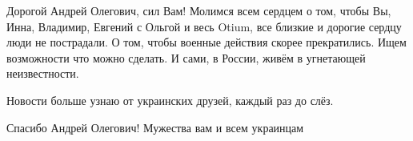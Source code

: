 \begin{itemize}

Дорогой Андрей Олегович, сил Вам! Молимся всем сердцем о том, чтобы Вы, Инна,
Владимир, Евгений с Ольгой и весь Otium, все близкие и дорогие сердцу люди не
пострадали. О том, чтобы военные действия скорее прекратились. Ищем возможности
что можно сделать. И сами, в России, живём в угнетающей неизвестности.

Новости больше узнаю от украинских друзей, каждый раз до слёз.

Спасибо Андрей Олегович! Мужества вам и всем украинцам

\end{itemize} %
